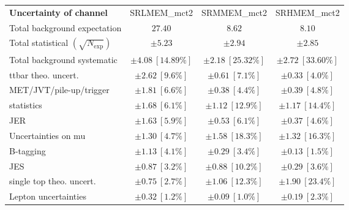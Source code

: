 
\begin{table}
\begin{center}
\setlength{\tabcolsep}{0.0pc}
\begin{tabular*}{\textwidth}{@{\extracolsep{\fill}}lccc}
\noalign{\smallskip}\hline\noalign{\smallskip}
{\textbf{Uncertainty of channel}}                                    & SRLMEM\_mct2            & SRMMEM\_mct2            & SRHMEM\_mct2            \\
\noalign{\smallskip}\hline\noalign{\smallskip}
Total background expectation             &  $27.40$        &  $8.62$        &  $8.10$       \\
\noalign{\smallskip}\hline\noalign{\smallskip}
Total statistical $(\sqrt{N_{\mathrm{exp}}})$              & $\pm 5.23$        & $\pm 2.94$        & $\pm 2.85$       \\
Total background systematic               & $\pm 4.08\ [14.89\%] $        & $\pm 2.18\ [25.32\%] $        & $\pm 2.72\ [33.60\%] $             \\
\noalign{\smallskip}\hline\noalign{\smallskip}
\noalign{\smallskip}\hline\noalign{\smallskip}
ttbar theo. uncert.         & $\pm 2.62\ [9.6\%] $          & $\pm 0.61\ [7.1\%] $          & $\pm 0.33\ [4.0\%] $       \\
MET/JVT/pile-up/trigger         & $\pm 1.81\ [6.6\%] $          & $\pm 0.38\ [4.4\%] $          & $\pm 0.39\ [4.8\%] $       \\
statistics         & $\pm 1.68\ [6.1\%] $          & $\pm 1.12\ [12.9\%] $          & $\pm 1.17\ [14.4\%] $       \\
JER         & $\pm 1.63\ [5.9\%] $          & $\pm 0.53\ [6.1\%] $          & $\pm 0.37\ [4.6\%] $       \\
Uncertainties on mu         & $\pm 1.30\ [4.7\%] $          & $\pm 1.58\ [18.3\%] $          & $\pm 1.32\ [16.3\%] $       \\
B-tagging         & $\pm 1.13\ [4.1\%] $          & $\pm 0.29\ [3.4\%] $          & $\pm 0.13\ [1.5\%] $       \\
JES         & $\pm 0.87\ [3.2\%] $          & $\pm 0.88\ [10.2\%] $          & $\pm 0.29\ [3.6\%] $       \\
single top theo. uncert.         & $\pm 0.75\ [2.7\%] $          & $\pm 1.06\ [12.3\%] $          & $\pm 1.90\ [23.4\%] $       \\
Lepton uncertainties         & $\pm 0.32\ [1.2\%] $          & $\pm 0.09\ [1.0\%] $          & $\pm 0.19\ [2.3\%] $       \\

\end{tabular*}
\end{center}
\end{table}
